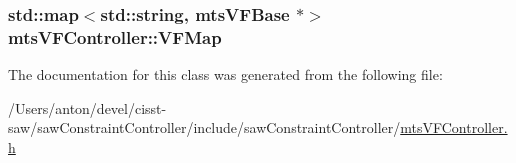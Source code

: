 \subsubsection[{V\+F\+Map}]{\setlength{\rightskip}{0pt plus 5cm}std\+::map$<$std\+::string, {\bf mts\+V\+F\+Base} $\ast$$>$ mts\+V\+F\+Controller\+::\+V\+F\+Map\hspace{0.3cm}{\ttfamily [protected]}}\label{classmts_v_f_controller_acf1cfa87ed1c4903f9b4e3c0b4885fa3}


The documentation for this class was generated from the following file\+:\begin{DoxyCompactItemize}
\item 
/\+Users/anton/devel/cisst-\/saw/saw\+Constraint\+Controller/include/saw\+Constraint\+Controller/\hyperlink{mts_v_f_controller_8h}{mts\+V\+F\+Controller.\+h}\end{DoxyCompactItemize}
